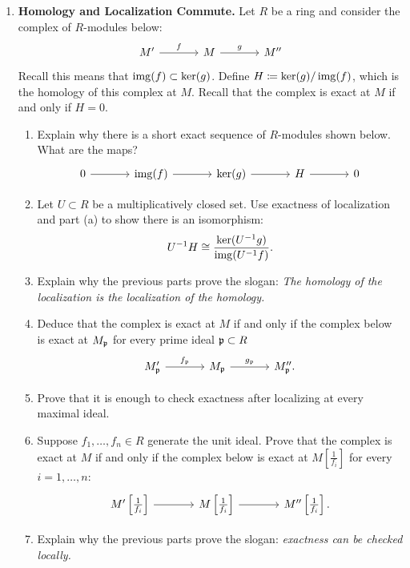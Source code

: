 \documentclass[12pt,reqno]{amsart}
\begin{document}
\begin{enumerate}[leftmargin=*, series=problems]
\item \textbf{Homology and Localization Commute.} Let $R$ be a ring and consider the complex of $R$-modules below:
\[
\begin{tikzcd}[row sep = .3em, column sep = 3.5em]
M' \arrow[r, "f"] & M \arrow[r, "g"] & M''
\end{tikzcd}
\]
Recall this means that $\operatorname{img}(f) \subset \ker(g)$. Define $H\coloneqq \ker(g)/\operatorname{img}(f)$, which is the homology of this complex at $M$. Recall that the complex is exact at $M$ if and only if $H=0$.
\begin{enumerate}
   \item  Explain why there is a short exact sequence of $R$-modules shown below. What are the maps?
   \[
\begin{tikzcd}[row sep = .3em, column sep = 3.5em]
0 \arrow[r] & \img(f) \arrow[r] & \ker(g) \arrow[r] & H \arrow[r] & 0
\end{tikzcd}
\]
    \item Let $U\subset R$ be a multiplicatively closed set. Use exactness of localization and part (a) to show there is an isomorphism:
    \[
    U^{-1}H\cong \frac{\ker(U^{-1}g)}{\operatorname{img}(U^{-1}f)}.
    \]
    \item Explain why the previous parts prove the slogan: \textit{The homology of the localization is the localization of the homology.}
    \item Deduce that the complex is exact at $M$ if and only if the complex below is exact at $M_{\mathfrak{p}}$ for every prime ideal $\mathfrak{p}\subset R$
    \[
\begin{tikzcd}[row sep = .3em, column sep = 3.5em]
    M'_{\fp} \arrow[r, "f_{\fp}"] & M_{\fp} \arrow[r, "g_{\fp}"] & M''_{\fp}.
    \end{tikzcd}
    \]
    \item Prove that it is enough to check exactness after localizing at every maximal ideal.
    \item Suppose $f_1,\ldots,f_n\in R$ generate the unit ideal. Prove that the complex is exact at $M$ if and only if the complex below is exact at $M[\frac{1}{f_{i}}]$ for every $i=1,\ldots,n$:
    \[
    \begin{tikzcd}[column sep=large]
    M'\left[\frac{1}{f_{i}}\right] \arrow[r] & M\left[\frac{1}{f_{i}}\right] \arrow[r] & M''\left[\frac{1}{f_{i}}\right].
    \end{tikzcd}
    \]
    \item Explain why the previous parts prove the slogan: \textit{exactness can be checked locally.}
\end{enumerate}


\end{enumerate}
\end{document}
